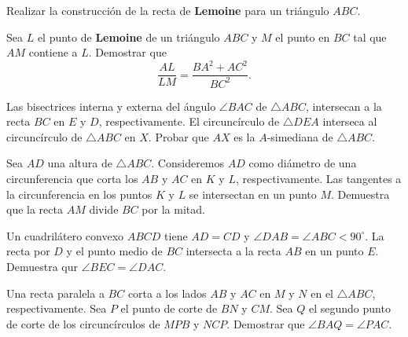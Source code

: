 \begin{section-exercise}
    Realizar la construcción de la recta de \textbf{Lemoine} para un triángulo $ABC$.
\end{section-exercise}

\begin{section-problem}
    Sea $L$ el punto de \textbf{Lemoine} de un triángulo $ABC$ y $M$ el punto en $BC$ tal que $AM$ contiene a $L$.
    Demostrar que
    \[
        \frac{AL}{LM} = \frac{BA^2 + AC^2}{BC^2}.
    \]
\end{section-problem}

\begin{section-problem}
    Las bisectrices interna y externa del ángulo $\angle BAC$ de $\triangle ABC$, intersecan a la recta $BC$ en $E$ y $D$, respectivamente.
    El circuncírculo de $\triangle DEA$ interseca al circuncírculo de $\triangle ABC$ en $X$.
    Probar que $AX$ es la $A$-simediana de $\triangle ABC$.
\end{section-problem}

\begin{section-problem}
    Sea $AD$ una altura de $\triangle ABC$.
    Consideremos $AD$ como diámetro de una circunferencia que corta los $AB$ y $AC$ en $K$ y $L$, respectivamente.
    Las tangentes a la circunferencia en los puntos $K$ y $L$ se intersectan en un punto $M$.
    Demuestra que la recta $AM$ divide $BC$ por la mitad.
\end{section-problem}

\begin{section-problem}
    Un cuadrilátero convexo $ABCD$ tiene $AD = CD$ y $\angle DAB = \angle ABC < 90^\circ$.
    La recta por $D$ y el punto medio de $BC$ intersecta a la recta $AB$ en un punto $E$.
    Demuestra qur $\angle BEC = \angle DAC$.
\end{section-problem}

\begin{section-problem}
    Una recta paralela a $BC$ corta a los lados $AB$ y $AC$ en $M$ y $N$ en el $\triangle ABC$, respectivamente.
    Sea $P$ el punto de corte de $BN$ y $CM$.
    Sea $Q$ el segundo punto de corte de los circuncírculos de $MPB$ y $NCP$.
    Demostrar que $\angle BAQ = \angle PAC$.
\end{section-problem}